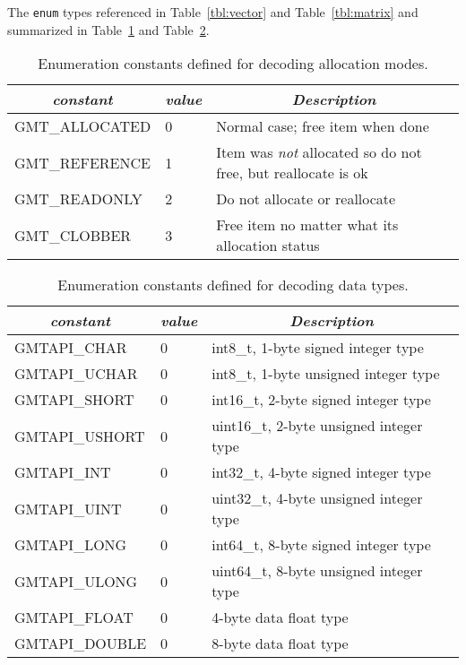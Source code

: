 \documentclass[11pt]{report}
\begin{document}
The \texttt{enum} types referenced in Table~\ref{tbl:vector} and Table~\ref{tbl:matrix} and summarized in Table~\ref{tbl:enums}
and Table~\ref{tbl:types}.
\begin{table}[h]
\small
\centering
\begin{tabular}{|l|l|l|} \hline
\multicolumn{1}{|c|}{\emph{constant}} & \multicolumn{1}{c|}{\emph{value}}  & \multicolumn{1}{c|}{\emph{Description}} \\ \hline
GMT\_ALLOCATED		&      0	& Normal case; free item when done \\ \hline
GMT\_REFERENCE		&      1	& Item was \emph{not} allocated so do not free, but reallocate is ok \\ \hline
GMT\_READONLY		&      2	& Do not allocate or reallocate \\ \hline
GMT\_CLOBBER		&      3	& Free item no matter what its allocation status \\ \hline
\end{tabular}
\caption{Enumeration constants defined for decoding allocation modes.}
\label{tbl:enums}
\end{table}

\begin{table}[h]
\small
\centering
\begin{tabular}{|l|l|l|} \hline
\multicolumn{1}{|c|}{\emph{constant}} & \multicolumn{1}{c|}{\emph{value}}  & \multicolumn{1}{c|}{\emph{Description}} \\ \hline
GMTAPI\_CHAR	&      0	& int8\_t, 1-byte signed integer type \\ \hline
GMTAPI\_UCHAR	&      0	& int8\_t, 1-byte unsigned integer type \\ \hline
GMTAPI\_SHORT	&      0	& int16\_t, 2-byte signed integer type \\ \hline
GMTAPI\_USHORT	&      0	& uint16\_t, 2-byte unsigned integer type \\ \hline
GMTAPI\_INT		&      0	& int32\_t, 4-byte signed integer type \\ \hline
GMTAPI\_UINT	&      0	& uint32\_t, 4-byte unsigned integer type \\ \hline
GMTAPI\_LONG	&      0	& int64\_t, 8-byte signed integer type \\ \hline
GMTAPI\_ULONG	&      0	& uint64\_t, 8-byte unsigned integer type \\ \hline
GMTAPI\_FLOAT	&      0	& 4-byte data float type \\ \hline
GMTAPI\_DOUBLE	&      0	& 8-byte data float type \\ \hline
\end{tabular}
\caption{Enumeration constants defined for decoding data types.}
\label{tbl:types}
\end{table}
\end{document}
